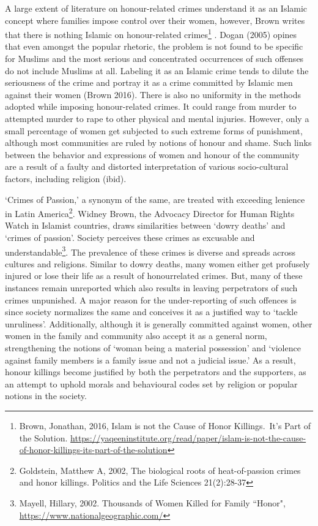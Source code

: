 \begin{multicols}{2}
\noi
A large extent of literature on honour-related crimes understand it as an Islamic concept
where families impose control over their women, however, Brown writes that there is
nothing Islamic on honour-related crimes\footnote{Brown, Jonathan, 2016, Islam is not the Cause of Honor Killings.~It’s Part of the Solution.
\url{https://yaqeeninstitute.org/read/paper/islam-is-not-the-cause-of-honor-killings-its-part-of-the-solution}}
. Dogan (2005) opines that even amongst the
popular rhetoric, the problem is not found to be specific for Muslims and the most
serious and concentrated occurrences of such offenses do not include Muslims at all.
Labeling it as an Islamic crime tends to dilute the seriousness of the crime and portray
it as a crime committed by Islamic men against their women (Brown 2016). There is
also no uniformity in the methods adopted while imposing honour-related crimes. It
could range from murder to attempted murder to rape to other physical and mental
injuries. However, only a small percentage of women get subjected to such extreme
forms of punishment, although most communities are ruled by notions of honour and
shame. Such links between the behavior and expressions of women and honour of the
community are a result of a faulty and distorted interpretation of various socio-cultural
factors, including religion (ibid). 


\newpage

\noi
‘Crimes of Passion,’ a synonym of the same, are treated with exceeding lenience in
Latin America\footnote{ Goldstein, Matthew A, 2002, The biological roots of heat-of-passion crimes and honor killings. Politics
and the Life Sciences 21(2):28-37}. Widney Brown, the Advocacy Director for Human Rights Watch in
Islamist countries, draws similarities between ‘dowry deaths’ and ‘crimes of passion’.
Society perceives these crimes as excusable and understandable\footnote{Mayell, Hillary, 2002. Thousands of Women Killed for Family “Honor",
\url{https://www.nationalgeographic.com/}}. The prevalence of
these crimes is diverse and spreads across cultures and religions. Similar to dowry
deaths, many women either get profusely injured or lose their life as a result of honourrelated crimes. But, many of these instances remain unreported which also results in
leaving perpetrators of such crimes unpunished. A major reason for the under-reporting
of such offences is since society normalizes the same and conceives it as a justified way
to ‘tackle unruliness’. Additionally, although it is generally committed against women,
other women in the family and community also accept it as a general norm,
strengthening the notions of ‘woman being a material possession’ and ‘violence against
family members is a family issue and not a judicial issue.’ As a result, honour killings become justified by both the perpetrators and the supporters, as an attempt to uphold
morals and behavioural codes set by religion or popular notions in the society.


\end{multicols}
